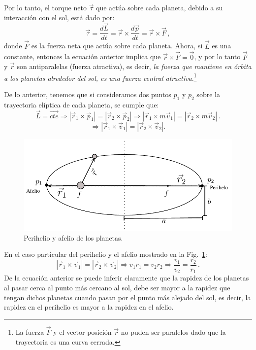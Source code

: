 \begin{enumerate}
\begin{equation}
\label{ec:L-constante}
\end{equation}
Por lo tanto, el torque neto $\vec{\tau}$ que actúa sobre cada planeta, debido a su interacción con el sol, está dado por:
\begin{equation}
\vec{\tau}= \dfrac{d\vec{L}}{dt}= \vec{r}\times \dfrac{d\vec{p}}{dt} = \vec{r} \times \vec{F}\,,
\end{equation}
donde $\vec{F}$ es la fuerza neta que actúa sobre cada planeta. Ahora, si $\vec{L}$ es una constante, entonces la ecuación anterior implica que $\vec{r}\times \vec{F}= \vec{0}$, y por lo tanto $\vec{F}$ y $\vec{r}$ son antiparalelas (fuerza atractiva), es decir, \textit{la fuerza que mantiene en órbita a los planetas alrededor del sol, es una fuerza central atractiva}.\footnote{La fuerza $\vec{F}$ y el vector posición $\vec{r}$ no puden ser paralelos dado que la trayectoria es una curva cerrada.}

De lo anterior, tenemos que si consideramos dos puntos $p_1$ y $p_2$ sobre la trayectoria elíptica de cada planeta, se cumple que:
\begin{equation}
\vec{L}=\vec{cte} \Rightarrow |\vec{r}_1 \times \vec{p}_1 |=|\vec{r}_2 \times \vec{p}_2 | \Rightarrow |\vec{r}_1 \times m\vec{v}_1 |=|\vec{r}_2 \times m\vec{v}_2 |\,. \nonumber
\end{equation}
\begin{equation}
\Rightarrow|\vec{r}_1 \times \vec{v}_1 |=|\vec{r}_2 \times \vec{v}_2 |.
\end{equation}
\begin{figure}[h]
\begin{center}
\includegraphics[scale=0.8]{gravitacion/g-perihelio}
\end{center}
\caption{Perihelio y afelio de los planetas.}
\label{fig:relacion-vr}
\end{figure}
En el caso particular del perihelio y el afelio  mostrado en la Fig.~\ref{fig:relacion-vr}:
\begin{equation}
|\vec{r}_1 \times \vec{v}_1 |=|\vec{r}_2 \times \vec{v}_2 |\Rightarrow v_1r_1 =v_2r_2 \Rightarrow 
\boxed{\dfrac{v_1}{v_2}=\dfrac{r_2}{r_1}}\,.
\end{equation}
De la ecuación anterior se puede inferir claramente que la rapidez de los planetas al pasar cerca al punto más cercano al sol, debe ser mayor a la rapidez que tengan dichos planetas cuando pasan por el punto más alejado del sol, es decir, la rapidez en el perihelio es mayor a la rapidez en el afelio.


\end{enumerate}
